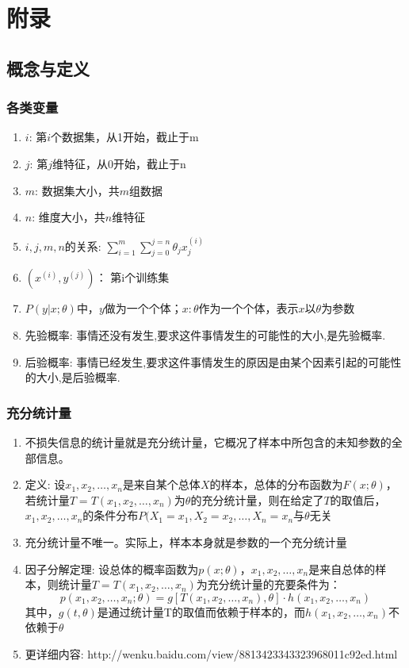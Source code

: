 \section{附录}
\subsection{概念与定义}
\subsubsection{各类变量}
\begin{enumerate}
	\item $i$: 第$i$个数据集，从1开始，截止于m
	\item $j$: 第$j$维特征，从0开始，截止于n
	\item $m$: 数据集大小，共$m$组数据
	\item $n$: 维度大小，共$n$维特征
	\item $i, j, m, n$的关系: $\sum_{i=1}^{m}\sum_{j=0}^{j=n}{\theta_{j}x_j^{(i)}}$
	\item $(x^{(i)}, y^{(j)})$： 第i个训练集
	\item $P(y|x;\theta)$中，$y$做为一个个体；$x:\theta$作为一个个体，表示$x$以$\theta$为参数
	\item 先验概率: 事情还没有发生,要求这件事情发生的可能性的大小,是先验概率. 
	\item 后验概率: 事情已经发生,要求这件事情发生的原因是由某个因素引起的可能性的大小,是后验概率.
\end{enumerate}

\subsubsection{充分统计量}
\begin{enumerate}
	\item 不损失信息的统计量就是充分统计量，它概况了样本中所包含的未知参数的全部信息。
	\item 定义: 设$x_1, x_2, \dots, x_n$是来自某个总体$X$的样本，总体的分布函数为$F(x;\theta)$，若统计量$T=T(x_1, x_2, \dots, x_n)$为$\theta$的充分统计量，则在给定了$T$的取值后，$x_1, x_2, \dots, x_n$的条件分布$P(X_1=x_1, X_2=x_2, \dots, X_n=x_n$与$\theta$无关
	\item 充分统计量不唯一。实际上，样本本身就是参数的一个充分统计量
	\item 因子分解定理{\color{red}{（没看懂）}}: 设总体的概率函数为$p(x;\theta)$，$x_1, x_2, \dots, x_n$是来自总体的样本，则统计量$T=T(x_1, x_2, \dots, x_n)$为充分统计量的充要条件为：
	\begin{equation}
		p(x_1, x_2, \dots, x_n;\theta) = g\left[T(x_1, x_2, \dots, x_n),\theta\right]\cdot h(x_1, x_2, \dots, x_n)
	\end{equation}
	其中，$g(t,\theta)$是通过统计量T的取值而依赖于样本的，而$h(x_1, x_2, \dots, x_n)$不依赖于$\theta$
	\item 更详细内容: http://wenku.baidu.com/view/8813423343323968011c92ed.html
\end{enumerate}

